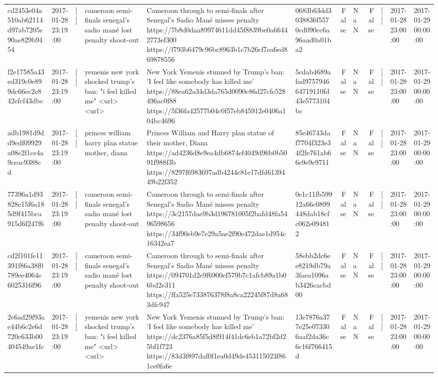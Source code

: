 \begin{tabular}{llllllrlrlll}
cd2453e04a510ab62114d97ab7205c90ae829b9454 & 2017-01-28 23:19:00 & [] & cameroon semi-finals senegal's sadio mané lost penalty shoot-out & Cameroon through to semi-finals after Senegal’s Sadio Mané misses penalty https://7b8d0daa89974611dd45f8839be0a66442773ef300 https://f793b6479c96bc8963b1c7b26cf7ea6ed869878556 & 0683b63dd3038836f5570cd090cc6a96aad0a01ba2 & False & NaN & False & [] & 2017-01-28 23:00:00 & 2017-01-29 00:00:00 \\
f2e17585a43ed319c0e899dc66ec2e842efcf43dbc & 2017-01-28 23:19:00 & [] & yemenis new york shocked trump's ban: "i feel killed me" <url> <url> & New York Yemenis stunned by Trump's ban: 'I feel like somebody has killed me' https://88ea62a34d3da765d0090c86d27cfe528496ac0f88 https://5f36fa42577b04c0f57eb845912e0406a104bc4696 & 5cdab4689afad975794664719110fd43e5773104bc & False & NaN & False & [] & 2017-01-28 23:00:00 & 2017-01-29 00:00:00 \\
adb1981d9dd9edf09929a08e2f1ce4a9ceac9388cd & 2017-01-28 23:19:00 & [] & princes william harry plan statue mother, diana & Princes William and Harry plan statue of their mother, Diana https://ad4236d8e9ea4db6874ef4049d96b0b5091f988f3b https://8297f6983697adb4244c81e17dfd6139449b22f352 & 85e46743daf7704f323e34f2fe761ab66e9e9e9711 & False & NaN & False & [] & 2017-01-28 23:00:00 & 2017-01-29 00:00:00 \\
77396a1d93828e15f6a185d9f415bca915d6f247f6 & 2017-01-28 23:19:00 & [] & cameroon semi-finals senegal's sadio mané lost penalty shoot-out & Cameroon through to semi-finals after Senegal’s Sadio Mané misses penalty https://3c2157dae9b3d196781005f2bafd48fa5496598656 https://34f90eb9e7e29a5ae2f90e472dae1d954c16342ea7 & 0e1c11fb59912a66c0899448dab18cfc062e094812 & False & NaN & False & [] & 2017-01-28 23:00:00 & 2017-01-29 00:00:00 \\
cd2f101fe11391f86a38f0789ee4064e6025316f96 & 2017-01-28 23:19:00 & [] & cameroon semi-finals senegal's sadio mané lost penalty shoot-out & Cameroon through to semi-finals after Senegal’s Sadio Mané misses penalty https://094701d2e9f6900ef579b7c1afcb89a1b06bd2e311 https://ffa525e733876378f8a8ca22245f87d8a683dfc947 & 58ebb2dc6ee8219db79a3faea1096ab3426cacbd00 & False & NaN & False & [] & 2017-01-28 23:00:00 & 2017-01-29 00:00:00 \\
2e6ad29f93ae44b6c2e6d720c633b00404549ae1fc & 2017-01-28 23:19:00 & [] & yemenis new york shocked trump's ban: "i feel killed me" <url> <url> & New York Yemenis stunned by Trump's ban: 'I feel like somebody has killed me' https://dc2376a85f5d8f914f41dc6eb1a72bf2d25bf1f723 https://83d3f897daf0f1ea0d49de453115023f861ce0fa6e & 13e7876a377e25e073306aaf2da36c6c16f766415d & False & NaN & False & [] & 2017-01-28 23:00:00 & 2017-01-29 00:00:00 \\

\end{tabular}
